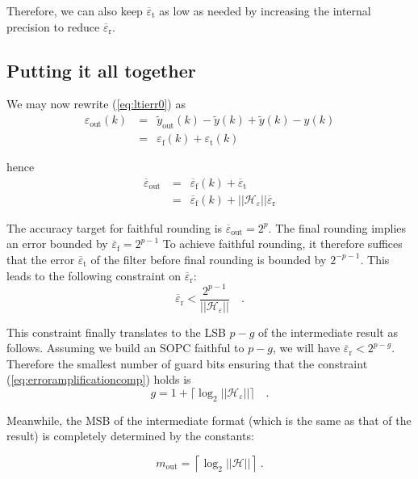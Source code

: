 \documentclass[twocolumn]{IEEEtran}
\newcommand{\abserr}{\varepsilon}
\newcommand{\maxerr}{\bound{\abserr}}
\newcommand{\appr}[1]{\widetilde{#1}}
\newcommand{\yout}{\widetilde{y}_{\text{out}}}
\newcommand{\epstotal}{\abserr_{\text{out}}}
\newcommand{\maxepstotal}{\maxerr_{\text{out}}}
\newcommand{\epsfinalround}{\abserr_{\text{f}}}
\newcommand{\maxepsfinalround}{\maxerr_{\text{f}}}
\newcommand{\maxepssopc}{\maxerr_{\text{r}}}
\newcommand{\epsytilde}{\abserr_{\text{t}}}
\newcommand{\maxepsytilde}{\maxerr_{\text{t}}}
\newcommand{\bound}[1]{\overline{#1}}
\newcommand{\wcpg}[1]{||#1||}
\newcommand{\wcpgHe}{\wcpg{\mathcal{H}_\abserr}}
\begin{document}
Therefore, we can also keep $\maxepsytilde$  as low as needed by increasing the internal precision to reduce $\maxepssopc$.


\subsection{Putting it all together}

We may now rewrite (\ref{eq:ltierr0}) as
\begin{eqnarray}
  \epstotal(k)\ &= & \yout(k) -\appr{y}(k) + \appr{y}(k) - y(k) \nonumber \\
  &=& \epsfinalround(k)+ \epsytilde(k)  \label{eq:ltierr16}
\end{eqnarray}

hence
\begin{eqnarray}
  \maxepstotal\ &= & \maxepsfinalround(k)+ \maxepsytilde \nonumber \\ 
 &=&  \maxepsfinalround(k)+ \wcpgHe \maxepssopc \label{eq:ltierr18}
\end{eqnarray}



The accuracy target for faithful rounding is $\maxepstotal=2^p$.
The final rounding implies an error bounded by $\maxepsfinalround=2^{p-1}$
To achieve faithful rounding, it therefore suffices that the error $\maxepsytilde$ of the filter before final rounding is bounded by $2^{-p-1}$.
This leads to the following constraint on $\maxepssopc$:
\begin{equation}
  \label{eq:erroramplificationcomp}
  \maxepssopc < \frac{2^{p-1}}{\wcpgHe} \quad.
\end{equation}

This constraint finally translates to the LSB $p-g$ of the intermediate result as follows.
Assuming we build an SOPC faithful to $p-g$, we will have $\maxepssopc<2^{p-g}$. 
Therefore the smallest number of guard bits ensuring that the constraint (\ref{eq:erroramplificationcomp}) holds is
\begin{equation}
  \label{eq:gfory}
  g= 1 + \lceil  \log_2\wcpgHe\rceil \quad.
\end{equation}



Meanwhile, the MSB of the intermediate format (which is the same as that of the result)  is completely determined by the constants:

\begin{equation}
m_{\text{out}} = \left\lceil \log_2\wcpg{\mathcal{H}}\right\rceil\ .\label{eq:MSBresult}
\end{equation}
\end{document}
